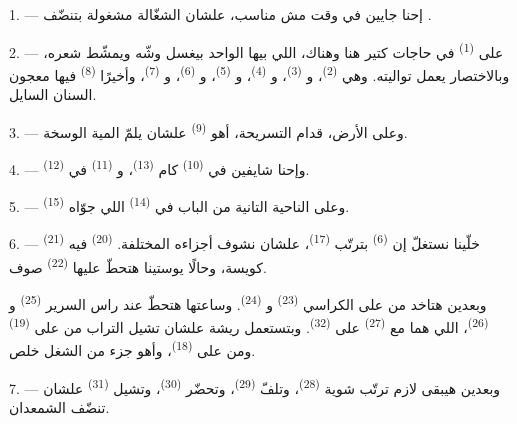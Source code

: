 \VUsaut{3.0mm}

1. --- إحنا جايين في وقت مش مناسب، علشان الشغّالة مشغولة بتنضّف
.

2. --- على  \textsuperscript{(1)} في حاجات كتير هنا وهناك،
اللي بيها الواحد بيغسل وشّه ويمشّط شعره، وبالاختصار يعمل تواليته. وهي
 \textsuperscript{(2)}، و \textsuperscript{(3)}،
و \textsuperscript{(4)}، و \textsuperscript{(5)}،
و \textsuperscript{(6)}، و \textsuperscript{(7)}، وأخيرًا
 \textsuperscript{(8)} فيها معجون السنان السايل.

3. --- وعلى الأرض، قدام التسريحة، أهو  \textsuperscript{(9)} علشان
يلمّ المية الوسخة.

4. --- وإحنا شايفين في  \textsuperscript{(10)} كام 
\textsuperscript{(13)}، و \textsuperscript{(11)} في 
\textsuperscript{(12)}.

5. --- وعلى الناحية التانية من الباب في 
\textsuperscript{(14)} اللي جوّاه  \textsuperscript{(15)}.

6. --- خلّينا نستغلّ إن  \textsuperscript{(6)} بترتّب 
\textsuperscript{(17)}، علشان نشوف أجزاءه المختلفة. 
\textsuperscript{(20)} فيه  \textsuperscript{(21)} كويسة، وحالًا يوستينا
هتحطّ عليها  \textsuperscript{(22)} صوف.

وبعدين هتاخد من على الكراسي  \textsuperscript{(23)}
و \textsuperscript{(24)}. وساعتها هتحطّ عند راس السرير
 \textsuperscript{(25)} و \textsuperscript{(26)}، اللي هما مع
 \textsuperscript{(27)} على 
\textsuperscript{(32)}. وبتستعمل ريشة علشان تشيل التراب من على 
\textsuperscript{(19)} ومن على  \textsuperscript{(18)}، وأهو جزء من الشغل
خلص.

7. --- وبعدين هيبقى لازم ترتّب شوية  \textsuperscript{(28)}، وتلفّ
 \textsuperscript{(29)}، وتحضّر 
\textsuperscript{(30)}،
وتشيل  \textsuperscript{(31)} علشان تنضّف الشمعدان.

